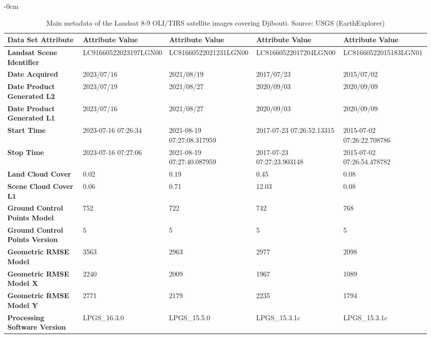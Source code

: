 \documentclass[jimaging,article,submit,pdftex,moreauthors]{Definitions/mdpi}
\begin{document}
\begin{table}[!ht]
\caption{Main metadata of the Landsat 8-9 OLI/TIRS satellite images covering Djibouti. Source: USGS (EarthExplorer)}
\label{tab02}
    \centering
    \setlength{\tabcolsep}{2.0mm}
\begin{adjustwidth}{-\extralength}{0cm}
\footnotesize 
    \begin{tabular}{|l|l|l|l|l|}
    \hline
        \textbf{Data Set Attribute} & \textbf{Attribute Value} & \textbf{Attribute Value} & \textbf{Attribute Value} & \textbf{Attribute Value} \\ \hline
        \textbf{Landsat Scene Identifier} & LC91660522023197LGN00 & LC81660522021231LGN00 & LC81660522017204LGN00 & LC81660522015183LGN01 \\ \hline
        \textbf{Date Acquired} & 2023/07/16 & 2021/08/19 & 2017/07/23 & 2015/07/02 \\ \hline
        \textbf{Date Product Generated L2} & 2023/07/19 & 2021/08/27 & 2020/09/03 & 2020/09/09 \\ \hline
        \textbf{Date Product Generated L1} & 2023/07/16 & 2021/08/27 & 2020/09/03 & 2020/09/09 \\ \hline
         \textbf{Start Time} & 2023-07-16 07:26:34 & 2021-08-19 07:27:08.317959 & 2017-07-23 07:26:52.13315 & 2015-07-02 07:26:22.708786 \\ \hline
        \textbf{Stop Time} & 2023-07-16 07:27:06 & 2021-08-19 07:27:40.087959 & 2017-07-23 07:27:23.903148 & 2015-07-02 07:26:54.478782 \\ \hline
        \textbf{Land Cloud Cover} & 0.02 & 0.19 & 0.45 & 0.08 \\ \hline
        \textbf{Scene Cloud Cover L1} & 0.06 & 0.71 & 12.03 & 0.08 \\ \hline
        \textbf{Ground Control Points Model} & 752 & 722 & 742 & 768 \\ \hline
        \textbf{Ground Control Points Version} & 5 & 5 & 5 & 5 \\ \hline
        \textbf{Geometric RMSE Model} & 3563 & 2963 & 2977 & 2098 \\ \hline
        \textbf{Geometric RMSE Model X} & 2240 & 2009 & 1967 & 1089 \\ \hline
        \textbf{Geometric RMSE Model Y} & 2771 & 2179 & 2235 & 1794 \\ \hline
        \textbf{Processing Software Version} & LPGS\_16.3.0 & LPGS\_15.5.0 & LPGS\_15.3.1c & LPGS\_15.3.1c \\ \hline

\end{tabular}
\end{adjustwidth}
\end{table}
\end{document}

